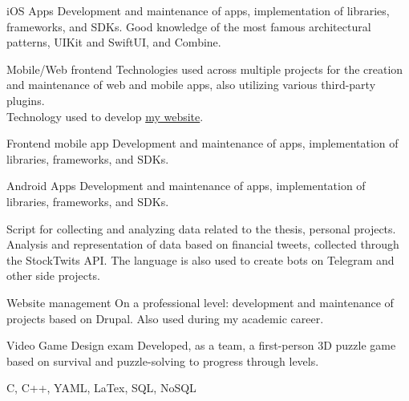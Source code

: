 \documentclass[
	a4paper,
]{fortysecondscv}
\begin{document}
\begin{cvtable}[2.6]
        {iOS Apps}
        {}
        {Development and maintenance of apps, implementation of libraries, frameworks, and SDKs. Good knowledge of the most famous architectural patterns, UIKit and SwiftUI, and Combine.}

        {Mobile/Web frontend}
        {}
        {Technologies used across multiple projects for the creation and maintenance of web and mobile apps, also utilizing various third-party plugins.\\ Technology used to develop \href{https://github.com/ilMike42/portfolio-full-stack-monorepo}{my website}.}
        
        {Frontend mobile app}
        {}
        {Development and maintenance of apps, implementation of libraries, frameworks, and SDKs.}
    
        {Android Apps}
        {}
        {Development and maintenance of apps, implementation of libraries, frameworks, and SDKs.}
    
        {Script for collecting and analyzing data related to the thesis, personal projects.}
        {}
        {Analysis and representation of data based on financial tweets, collected through the StockTwits API. The language is also used to create bots on Telegram and other side projects.}
    
        {Website management}
        {}
        {On a professional level: development and maintenance of projects based on Drupal. Also used during my academic career.}
    
        {Video Game Design exam}
        {}
        {Developed, as a team, a first-person 3D puzzle game based on survival and puzzle-solving to progress through levels.}
    
        {C, C++, YAML, LaTex, SQL, NoSQL}
        {}
        { }
\end{cvtable}

\cvsignature

\let\thefootnote\relax{}
\end{document}
